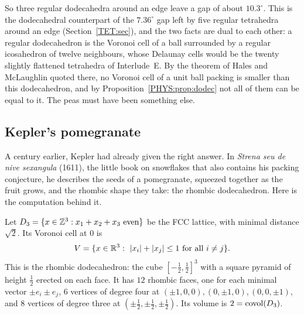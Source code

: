So three regular dodecahedra around an edge leave a gap of about $10.3^\circ$. This is the
dodecahedral counterpart of the $7.36^\circ$ gap left by five regular tetrahedra around an edge
(Section~\ref{TET:sec}), and the two facts are dual to each other: a regular dodecahedron is the
Voronoi cell of a ball surrounded by a regular icosahedron of twelve neighbours, whose Delaunay cells
would be the twenty slightly flattened tetrahedra of Interlude~E. By the theorem of Hales and
McLaughlin quoted there, no Voronoi cell of a unit ball packing is smaller than this dodecahedron, and
by Proposition~\ref{PHYS:prop:dodec} not all of them can be equal to it. The peas must have been
something else.

\subsection*{Kepler's pomegranate}
A century earlier, Kepler had already given the right answer. In \emph{Strena seu de nive sexangula}
(1611), the little book on snowflakes that also contains his packing conjecture, he describes the
seeds of a pomegranate, squeezed together as the fruit grows, and the rhombic shape they take: the
rhombic dodecahedron. Here is the computation behind it.

\begin{proposition}\label{PHYS:prop:rd}
Let $D_3=\{x\in\mathbb{Z}^3:x_1+x_2+x_3\ \text{even}\}$ be the FCC lattice, with minimal distance $\sqrt2$. Its
Voronoi cell at $0$ is
\[
  V=\{x\in\R^3:\ \abs{x_i}+\abs{x_j}\le1\ \text{for all }i\ne j\}.
\]
This is the rhombic dodecahedron: the cube $[-\frac12,\frac12]^3$ with a square pyramid of height
$\frac12$ erected on each face. It has $12$ rhombic faces, one for each minimal vector $\pm e_i\pm e_j$, $6$
vertices of degree four at $(\pm1,0,0),(0,\pm1,0),(0,0,\pm1)$, and $8$ vertices of degree three at
$(\pm\frac12,\pm\frac12,\pm\frac12)$. Its volume is $2=\operatorname{covol}(D_3)$.
\end{proposition}

